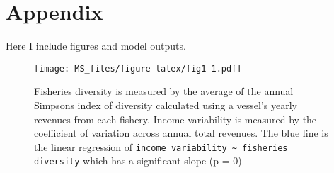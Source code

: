 \documentclass[]{article}
\begin{document}
\section{Appendix}\label{appendix}

Here I include figures and model outputs.

\begin{figure}[htbp]
\centering
\texttt{[image: MS\_files/figure-latex/fig1-1.pdf]}
\caption{Fisheries diversity is measured by the average of the annual
Simpsons index of diversity calculated using a vessel's yearly revenues
from each fishery. Income variability is measured by the coefficient of
variation across annual total revenues. The blue line is the linear
regression of
\texttt{income variability \textasciitilde{} fisheries diversity} which
has a significant slope (p = 0)}
\end{figure}
\end{document}
